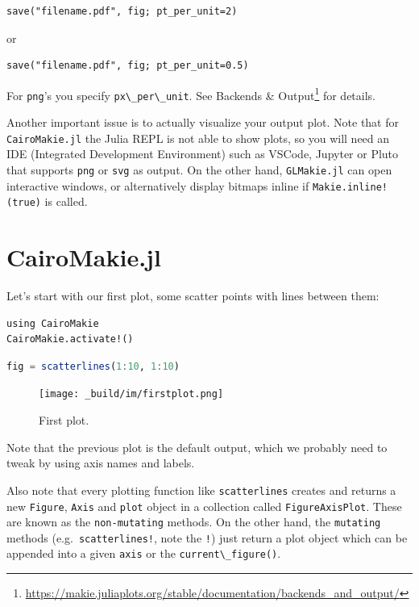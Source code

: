 \documentclass[
  notoc %
]{tufte-book}
\DeclareRobustCommand{\href}[2]{#2\footnote{\url{#1}}}
\newcommand{\passthrough}[1]{#1}
\begin{document}
\begin{lstlisting}
save("filename.pdf", fig; pt_per_unit=2)
\end{lstlisting}

or

\begin{lstlisting}
save("filename.pdf", fig; pt_per_unit=0.5)
\end{lstlisting}

For \passthrough{\lstinline!png!}'s you specify
\passthrough{\lstinline!px\_per\_unit!}. See
\href{https://makie.juliaplots.org/stable/documentation/backends_and_output/}{Backends
\& Output} for details.

Another important issue is to actually visualize your output plot. Note
that for \passthrough{\lstinline!CairoMakie.jl!} the Julia REPL is not
able to show plots, so you will need an IDE (Integrated Development
Environment) such as VSCode, Jupyter or Pluto that supports
\passthrough{\lstinline!png!} or \passthrough{\lstinline!svg!} as
output. On the other hand, \passthrough{\lstinline!GLMakie.jl!} can open
interactive windows, or alternatively display bitmaps inline if
\passthrough{\lstinline"Makie.inline!(true)"} is called.

\hypertarget{sec:cairomakie}{%
\section{CairoMakie.jl}\label{sec:cairomakie}}

Let's start with our first plot, some scatter points with lines between
them:

\begin{lstlisting}
using CairoMakie
CairoMakie.activate!()
\end{lstlisting}

\begin{lstlisting}[language=Julia]
fig = scatterlines(1:10, 1:10)
\end{lstlisting}

\begin{figure}
\hypertarget{fig:firstplot}{%
\centering
\texttt{[image: \_build/im/firstplot.png]}
\caption{First plot.}\label{fig:firstplot}
}
\end{figure}

Note that the previous plot is the default output, which we probably
need to tweak by using axis names and labels.

Also note that every plotting function like
\passthrough{\lstinline!scatterlines!} creates and returns a new
\passthrough{\lstinline!Figure!}, \passthrough{\lstinline!Axis!} and
\passthrough{\lstinline!plot!} object in a collection called
\passthrough{\lstinline!FigureAxisPlot!}. These are known as the
\passthrough{\lstinline!non-mutating!} methods. On the other hand, the
\passthrough{\lstinline!mutating!} methods
(e.g.~\passthrough{\lstinline"scatterlines!"}, note the
\passthrough{\lstinline"!"}) just return a plot object which can be
appended into a given \passthrough{\lstinline!axis!} or the
\passthrough{\lstinline!current\_figure()!}.
\end{document}
